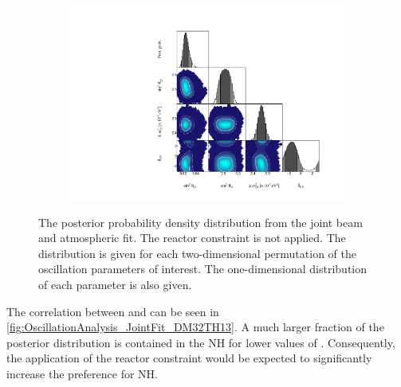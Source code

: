 \begin{figure}[h]
  \begin{subfigure}[t]{0.98\textwidth}
    \includegraphics[width=\textwidth, trim={0mm 0mm 0mm 0mm}, clip,page=1]{Figures/OA/JointFit/Contours_1D_woRC_UnSmeared_CredibleInterval_TrianglePlot.pdf}
  \end{subfigure}
  \caption{The posterior probability density distribution from the joint beam and atmospheric fit. The reactor constraint is not applied. The distribution is given for each two-dimensional permutation of the oscillation parameters of interest. The one-dimensional distribution of each parameter is also given.}
  \label{fig:OscillationAnalysis_JointFit_TriPlot}
\end{figure}

The correlation between  and  can be seen in \autoref{fig:OscillationAnalysis_JointFit_DM32TH13}. A much larger fraction of the posterior distribution is contained in the NH for lower values of . Consequently, the application of the reactor constraint would be expected to significantly increase the preference for NH.

